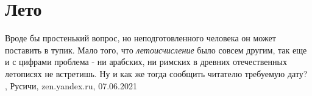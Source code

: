  
 
 
 
 
\chapter{Лето}

Вроде бы простенький вопрос, но неподготовленного человека он может поставить в
тупик. Мало того, что \emph{летоисчисление} было совсем другим, так еще и с цифрами
проблема - ни арабских, ни римских в древних отечественных летописях не
встретишь. Ну и как же тогда сообщить читателю требуемую дату?
, 
Русичи, zen.yandex.ru, 07.06.2021
